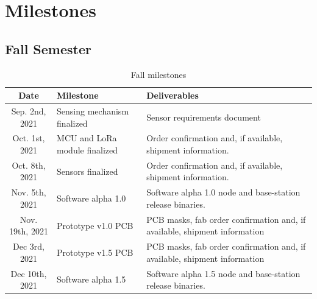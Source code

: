 \documentclass{article}
\begin{document}
\section{Milestones}

\subsection{Fall Semester}
%
%
\begin{table}[H]
    \begin{tabularx}{\linewidth}{|c|X|X|}
        \hline
        Date & Milestone & Deliverables \\
        \hline\hline
        Sep. 2nd, 2021 
        & Sensing mechanism finalized 
        & Sensor requirements document \\
        
        \hline
        Oct. 1st, 2021
        & MCU and LoRa module finalized
        & Order confirmation and, if available, shipment information. \\
        
        \hline
        Oct. 8th, 2021 
        & Sensors finalized 
        & Order confirmation and, if available, shipment information. \\
        
        \hline
        Nov. 5th, 2021 
        & Software alpha 1.0 
        & Software alpha 1.0 node and base-station release binaries. \\ 
        
        \hline
        Nov. 19th, 2021 & Prototype v1.0 PCB 
        & PCB masks, fab order confirmation and, if available, shipment information \\
        
        \hline
        Dec 3rd, 2021 & Prototype v1.5 PCB 
        & PCB masks, fab order confirmation and, if available, shipment information \\
        
        \hline
        Dec 10th, 2021 
        & Software alpha 1.5 
        & Software alpha 1.5 node and base-station release binaries. \\ 
        
        \hline
    \end{tabularx}
    \caption{Fall milestones}
\end{table}
\end{document}
